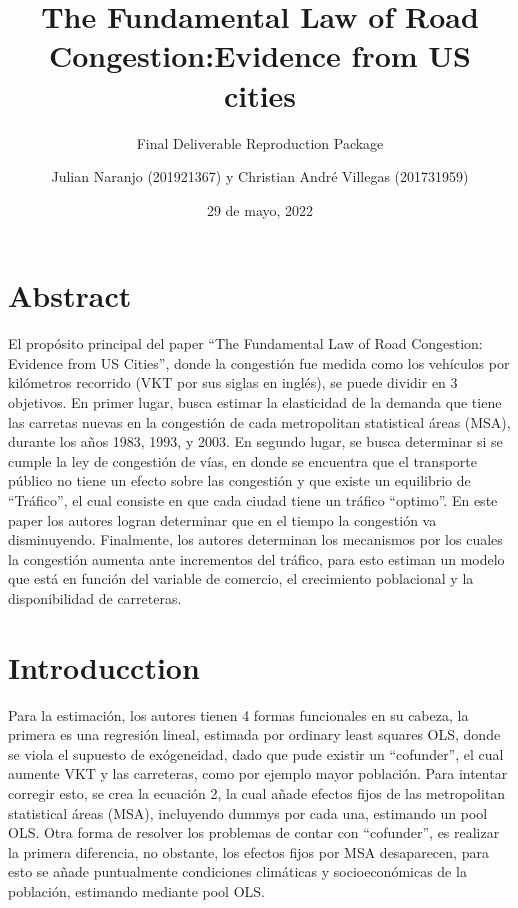 \documentclass[
]{article}
\title{The Fundamental Law of Road Congestion:Evidence from US cities}
\subtitle{Final Deliverable Reproduction Package}
\author{Julian Naranjo (201921367) y Christian André Villegas
(201731959)}
\date{29 de mayo, 2022}
\begin{document}
\maketitle

\setcounter{tocdepth}{5}
\renewcommand\thesection{\roman{section}}

\hypertarget{abstract}{%
\section{Abstract}\label{abstract}}

El propósito principal del paper ``The Fundamental Law of Road
Congestion: Evidence from US Cities'', donde la congestión fue medida
como los vehículos por kilómetros recorrido (VKT por sus siglas en
inglés), se puede dividir en 3 objetivos. En primer lugar, busca estimar
la elasticidad de la demanda que tiene las carretas nuevas en la
congestión de cada metropolitan statistical áreas (MSA), durante los
años 1983, 1993, y 2003. En segundo lugar, se busca determinar si se
cumple la ley de congestión de vías, en donde se encuentra que el
transporte público no tiene un efecto sobre las congestión y que existe
un equilibrio de ``Tráfico'', el cual consiste en que cada ciudad tiene
un tráfico ``optimo''. En este paper los autores logran determinar que
en el tiempo la congestión va disminuyendo. Finalmente, los autores
determinan los mecanismos por los cuales la congestión aumenta ante
incrementos del tráfico, para esto estiman un modelo que está en función
del variable de comercio, el crecimiento poblacional y la disponibilidad
de carreteras.

\hypertarget{introducction}{%
\section{Introducction}\label{introducction}}

Para la estimación, los autores tienen 4 formas funcionales en su
cabeza, la primera es una regresión lineal, estimada por ordinary least
squares OLS, donde se viola el supuesto de exógeneidad, dado que pude
existir un ``cofunder'', el cual aumente VKT y las carreteras, como por
ejemplo mayor población. Para intentar corregir esto, se crea la
ecuación 2, la cual añade efectos fijos de las metropolitan statistical
áreas (MSA), incluyendo dummys por cada una, estimando un pool OLS. Otra
forma de resolver los problemas de contar con ``cofunder'', es realizar
la primera diferencia, no obstante, los efectos fijos por MSA
desaparecen, para esto se añade puntualmente condiciones climáticas y
socioeconómicas de la población, estimando mediante pool OLS.
\end{document}
